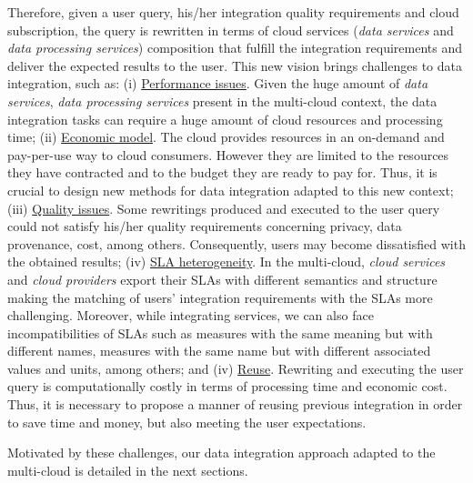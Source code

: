 Therefore, given a user query, his/her integration quality requirements and cloud subscription, the query is rewritten in terms of cloud services (\textit{data services} and \textit{data processing services}) composition that fulfill the integration requirements and deliver the expected results to the user. This new vision brings challenges to data integration, such as: (i) \underline{Performance issues}. Given the huge amount of \textit{data services}, \textit{data processing services} present in the multi-cloud context, the data integration tasks can require a huge amount of cloud resources and processing time; (ii) \underline{Economic model}. The cloud provides resources in an on-demand and pay-per-use way to cloud consumers. However they are limited to the resources they have contracted and to the budget they are ready to pay for. Thus, it is crucial to design new methods for data integration adapted to this new context; (iii) \underline{Quality issues}. Some rewritings produced and executed to the user query could not satisfy his/her quality requirements concerning privacy, data provenance, cost, among others. Consequently, users may become dissatisfied with the obtained results; (iv) \underline{SLA heterogeneity}. In the multi-cloud, \textit{cloud services} and \textit{cloud providers} export their SLAs with different semantics and structure making the matching of users' integration requirements with the SLAs more challenging. Moreover, while integrating services, we can also face incompatibilities of SLAs such as measures with the same meaning but with different names, measures with the same name but with different associated values and units, among others; and (iv) \underline{Reuse}. Rewriting and executing the user query is computationally costly in terms of processing time and economic cost. Thus, it is necessary to propose a manner of reusing previous integration in order to save time and money, but also meeting the user expectations.

Motivated by these challenges, our data integration approach adapted to the multi-cloud is detailed in the next sections.


